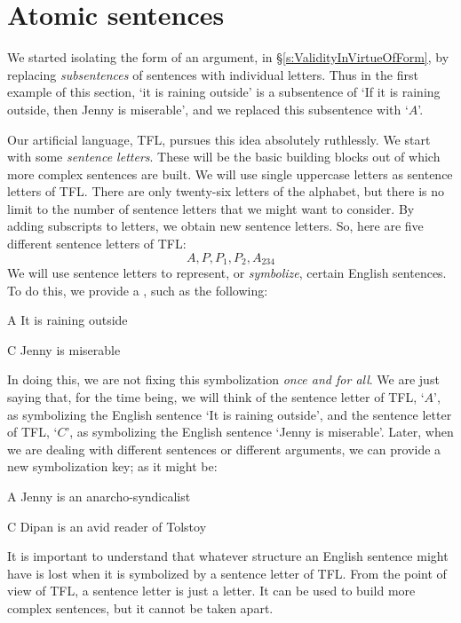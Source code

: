 \section{Atomic sentences}

We started isolating the form of an argument, in \S\ref{s:ValidityInVirtueOfForm}, by replacing  \emph{subsentences} of sentences with individual letters. Thus in the first example of this section, `it is raining outside' is a subsentence of `If it is raining outside, then Jenny is miserable', and we replaced this subsentence with `$A$'.

Our artificial language, TFL, pursues this idea absolutely ruthlessly. We start with some \emph{sentence letters}. These will be the basic building blocks out of which more complex sentences are built. We will use single uppercase letters as sentence letters of TFL. There are only twenty-six letters of the alphabet, but there is no limit to the number of sentence letters that we might want to consider. By adding subscripts to letters, we obtain new sentence letters. So, here are five different sentence letters of TFL:
	$$A, P, P_1, P_2, A_{234}$$
We will use sentence letters to represent, or \emph{symbolize}, certain English sentences. To do this, we provide a , such as the following:
	\begin{ekey}
		\item[A] It is raining outside
		\item[C] Jenny is miserable
	\end{ekey}
In doing this, we are not fixing this symbolization \emph{once and for all}. We are just saying that, for the time being, we will think of the sentence letter of TFL, `$A$', as symbolizing the English sentence `It is raining outside', and the sentence letter of TFL, `$C$', as symbolizing the English sentence `Jenny is miserable'. Later, when we are dealing with different sentences or different arguments, we can provide a new symbolization key; as it might be:
	\begin{ekey}
		\item[A] Jenny is an anarcho-syndicalist
		\item[C] Dipan is an avid reader of Tolstoy
	\end{ekey}
It is important to understand that whatever structure an English sentence might have is lost when it is symbolized by a sentence letter of TFL. From the point of view of TFL, a sentence letter is just a letter. It can be used to build more complex sentences, but it cannot be taken apart.


